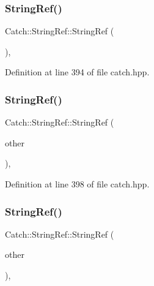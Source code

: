 \subsubsection{\texorpdfstring{String\+Ref()}{StringRef()}\hspace{0.1cm}{\footnotesize\ttfamily [1/6]}}
{\footnotesize\ttfamily Catch\+::\+String\+Ref\+::\+String\+Ref (\begin{DoxyParamCaption}{ }\end{DoxyParamCaption})\hspace{0.3cm}{\ttfamily [inline]}, {\ttfamily [noexcept]}}



Definition at line 394 of file catch.\+hpp.

\mbox{\label{class_catch_1_1_string_ref_a2f287267c3a988b288bfd910667c1cfc}} 
\subsubsection{\texorpdfstring{String\+Ref()}{StringRef()}\hspace{0.1cm}{\footnotesize\ttfamily [2/6]}}
{\footnotesize\ttfamily Catch\+::\+String\+Ref\+::\+String\+Ref (\begin{DoxyParamCaption}\item[{\mbox{\hyperlink{class_catch_1_1_string_ref}{String\+Ref}} const \&}]{other }\end{DoxyParamCaption})\hspace{0.3cm}{\ttfamily [inline]}, {\ttfamily [noexcept]}}



Definition at line 398 of file catch.\+hpp.

\mbox{\label{class_catch_1_1_string_ref_a407d5737b94e5a374add5c2794589733}} 
\subsubsection{\texorpdfstring{String\+Ref()}{StringRef()}\hspace{0.1cm}{\footnotesize\ttfamily [3/6]}}
{\footnotesize\ttfamily Catch\+::\+String\+Ref\+::\+String\+Ref (\begin{DoxyParamCaption}\item[{\mbox{\hyperlink{class_catch_1_1_string_ref}{String\+Ref}} \&\&}]{other }\end{DoxyParamCaption})\hspace{0.3cm}{\ttfamily [inline]}, {\ttfamily [noexcept]}}



